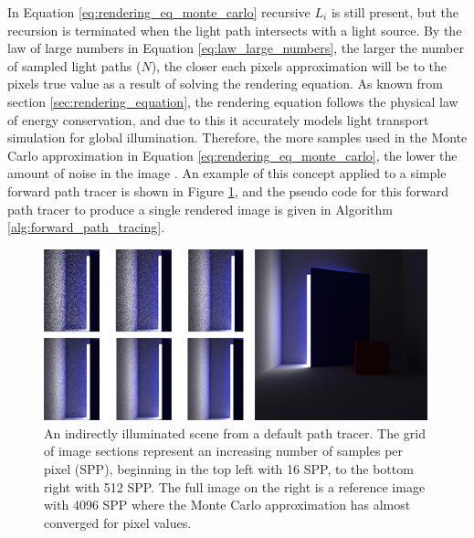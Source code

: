\documentclass[../dissertation.tex]{subfiles}
\begin{document}
In Equation \ref{eq:rendering_eq_monte_carlo} recursive $L_i$ is still present, but the recursion is terminated when the light path intersects with a light source. By the law of large numbers in Equation \ref{eq:law_large_numbers}, the larger the number of sampled light paths ($N$), the closer each pixels approximation will be to the pixels true value as a result of solving the rendering equation. As known from section \ref{sec:rendering_equation}, the rendering equation follows the physical law of energy conservation, and due to this it accurately models light transport simulation for global illumination. Therefore, the more samples used in the Monte Carlo approximation in Equation \ref{eq:rendering_eq_monte_carlo}, the lower the amount of noise in the image \cite{christensen2016path}. An example of this concept applied to a simple forward path tracer is shown in Figure \ref{fig:reduce_noise_spp_example}, and the pseudo code for this forward path tracer to produce a single rendered image is given in Algorithm \ref{alg:forward_path_tracing}.

\begin{figure}[h]
\begin{center}
\includegraphics[width=0.99\textwidth]{images/renders/noise_reduction_default/increasing_samples.png}    
\end{center}
\caption{An indirectly illuminated scene from a default path tracer. The grid of image sections represent an increasing number of samples per pixel (SPP), beginning in the top left with 16 SPP, to the bottom right with 512 SPP. The full image on the right is a reference image with 4096 SPP where the Monte Carlo approximation has almost converged for pixel values.}
\label{fig:reduce_noise_spp_example}
\end{figure}
\end{document}
